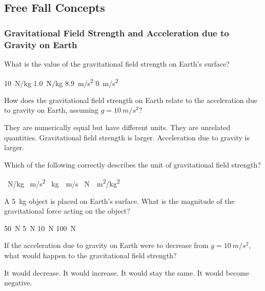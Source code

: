 \documentclass[../main-physics-problems.tex]{subfiles}
\begin{document}
\setcounter{section}{6}
\subsection{Free Fall Concepts}

\subsubsection{Gravitational Field Strength and Acceleration due to Gravity on Earth}



\begin{questions}

\question  
What is the value of the gravitational field strength on Earth's surface?  
\begin{randomizechoices}  
    \correctchoice \SI{10}{N/kg}  
    \choice \SI{1.0}{N/kg}  
    \choice \SI{8.9}{m/s^2}  
    \choice \SI{0}{m/s^2}  
\end{randomizechoices}  



\question  
How does the gravitational field strength on Earth relate to the acceleration due to gravity on Earth, assuming \( g = \SI{10}{m/s^2} \)?  

\begin{randomizechoices}  
    \correctchoice They are numerically equal but have different units.  
    \choice They are unrelated quantities.  
    \choice Gravitational field strength is larger.  
    \choice Acceleration due to gravity is larger.  
\end{randomizechoices}  



\question  
Which of the following correctly describes the unit of gravitational field strength?  

\begin{randomizechoices}  
    \correctchoice \SI{}{N/kg}  
    \choice \SI{}{m/s^2}  
    \choice \SI{}{kg \cdot m/s}  
    \choice \SI{}{N \cdot m^2/kg^2}  
\end{randomizechoices}  


\question 

A \SI{5}{kg} object is placed on Earth's surface. What is the magnitude of the gravitational force acting on the object?  
\begin{randomizechoices}  
    \correctchoice \SI{50}{N}  
    \choice \SI{5}{N}  
    \choice \SI{10}{N}  
    \choice \SI{100}{N}  
\end{randomizechoices}  



\question  
If the acceleration due to gravity on Earth were to decrease from \( g = \SI{10}{m/s^2} \), what would happen to the gravitational field strength?  

\begin{randomizechoices}  
    \correctchoice It would decrease.  
    \choice It would increase.  
    \choice It would stay the same.  
    \choice It would become negative.  
\end{randomizechoices}  
\end{questions}
\end{document}
